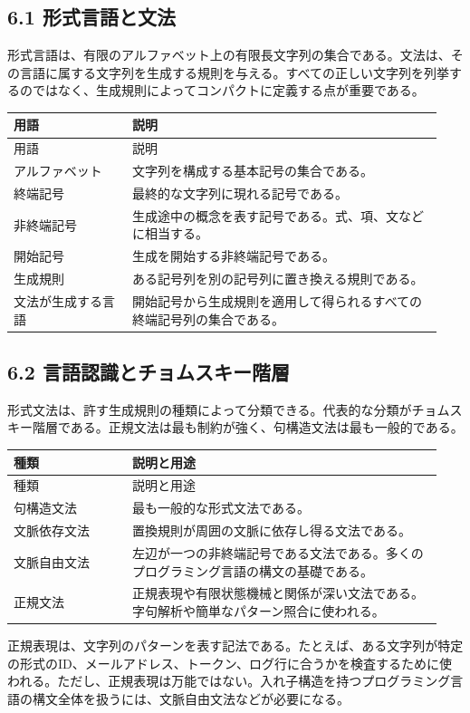 \documentclass[uplatex,dvipdfmx,a4paper,10pt]{jsarticle}
\begin{document}
\subsection{6.1 形式言語と文法}
形式言語は、有限のアルファベット上の有限長文字列の集合である。文法は、その言語に属する文字列を生成する規則を与える。すべての正しい文字列を列挙するのではなく、生成規則によってコンパクトに定義する点が重要である。

\begin{longtable}{>{\raggedright\arraybackslash}p{0.26\linewidth} >{\raggedright\arraybackslash}p{0.68\linewidth}}
\toprule
用語 & 説明 \\
\midrule
\endfirsthead
\toprule
用語 & 説明 \\
\midrule
\endhead
アルファベット & 文字列を構成する基本記号の集合である。 \\
終端記号 & 最終的な文字列に現れる記号である。 \\
非終端記号 & 生成途中の概念を表す記号である。式、項、文などに相当する。 \\
開始記号 & 生成を開始する非終端記号である。 \\
生成規則 & ある記号列を別の記号列に置き換える規則である。 \\
文法が生成する言語 & 開始記号から生成規則を適用して得られるすべての終端記号列の集合である。 \\
\bottomrule
\end{longtable}
\subsection{6.2 言語認識とチョムスキー階層}
形式文法は、許す生成規則の種類によって分類できる。代表的な分類がチョムスキー階層である。正規文法は最も制約が強く、句構造文法は最も一般的である。

\begin{longtable}{>{\raggedright\arraybackslash}p{0.26\linewidth} >{\raggedright\arraybackslash}p{0.68\linewidth}}
\toprule
種類 & 説明と用途 \\
\midrule
\endfirsthead
\toprule
種類 & 説明と用途 \\
\midrule
\endhead
句構造文法 & 最も一般的な形式文法である。 \\
文脈依存文法 & 置換規則が周囲の文脈に依存し得る文法である。 \\
文脈自由文法 & 左辺が一つの非終端記号である文法である。多くのプログラミング言語の構文の基礎である。 \\
正規文法 & 正規表現や有限状態機械と関係が深い文法である。字句解析や簡単なパターン照合に使われる。 \\
\bottomrule
\end{longtable}
正規表現は、文字列のパターンを表す記法である。たとえば、ある文字列が特定の形式のID、メールアドレス、トークン、ログ行に合うかを検査するために使われる。ただし、正規表現は万能ではない。入れ子構造を持つプログラミング言語の構文全体を扱うには、文脈自由文法などが必要になる。
\end{document}
